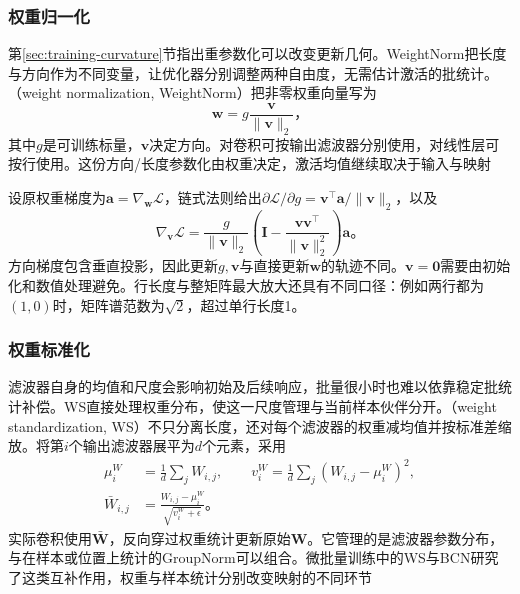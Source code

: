 \subsubsection{权重归一化}
\label{sec:training-weightnorm}
第\ref{sec:training-curvature}节指出重参数化可以改变更新几何。WeightNorm把长度与方向作为不同变量，让优化器分别调整两种自由度，无需估计激活的批统计。（weight normalization, WeightNorm）把非零权重向量写为
\begin{equation}
  \bm w=g\frac{\bm v}{\lVert\bm v\rVert_2}\text{，}
  \label{eq:training-weightnorm}
\end{equation}
其中$g$是可训练标量，$\bm v$决定方向。对卷积可按输出滤波器分别使用，对线性层可按行使用。这份方向/长度参数化由权重决定，激活均值继续取决于输入与映射

设原权重梯度为$\bm a=\nabla_{\bm w}\mathcal L$，链式法则给出$\partial\mathcal L/\partial g=\bm v^{\top}\bm a/\lVert\bm v\rVert_2$，以及
\begin{equation}
  \nabla_{\bm v}\mathcal L
  =\frac{g}{\lVert\bm v\rVert_2}
    \left(\bm I-\frac{\bm v\bm v^{\top}}{\lVert\bm v\rVert_2^2}\right)\bm a\text{。}
  \label{eq:training-weightnorm-gradient}
\end{equation}
方向梯度包含垂直投影，因此更新$g,\bm v$与直接更新$\bm w$的轨迹不同。$\bm v=\bm0$需要由初始化和数值处理避免。行长度与整矩阵最大放大还具有不同口径：例如两行都为$(1,0)$时，矩阵谱范数为$\sqrt2$，超过单行长度1。

\subsubsection{权重标准化}
\label{sec:training-weight-standardization}
滤波器自身的均值和尺度会影响初始及后续响应，批量很小时也难以依靠稳定批统计补偿。WS直接处理权重分布，使这一尺度管理与当前样本伙伴分开。（weight standardization, WS）不只分离长度，还对每个滤波器的权重减均值并按标准差缩放。将第$i$个输出滤波器展平为$d$个元素，采用
\begin{equation}
  \begin{aligned}
    \mu_i^W&=\frac1d\sum_jW_{i,j},\qquad
    v_i^W=\frac1d\sum_j(W_{i,j}-\mu_i^W)^2,\\
    \bar W_{i,j}&=\frac{W_{i,j}-\mu_i^W}{\sqrt{v_i^W+\epsilon}}\text{。}
  \end{aligned}
  \label{eq:training-weight-standardization}
\end{equation}
实际卷积使用$\bar{\bm W}$，反向穿过权重统计更新原始$\bm W$。它管理的是滤波器参数分布，与在样本或位置上统计的GroupNorm可以组合。微批量训练中的WS与BCN研究了这类互补作用，权重与样本统计分别改变映射的不同环节

